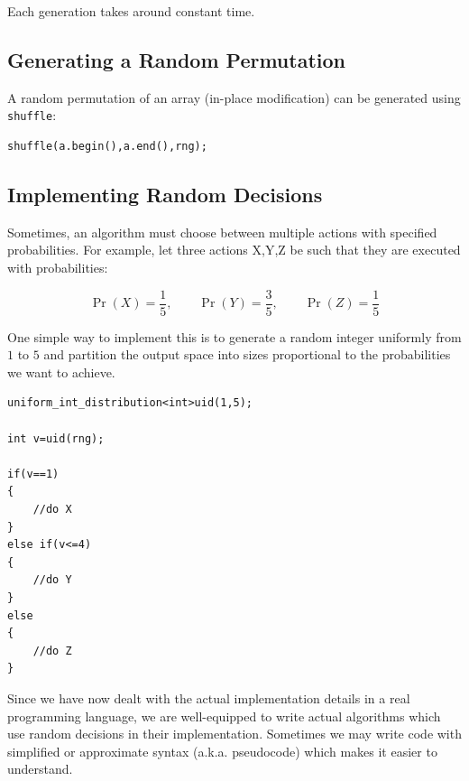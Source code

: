 \noindent Each generation takes around constant time.

\subsection*{Generating a Random Permutation}

A random permutation of an array (in-place modification) can be generated using \texttt{shuffle}:

\begin{verbatim}
shuffle(a.begin(),a.end(),rng);
\end{verbatim}

\subsection*{Implementing Random Decisions}

Sometimes, an algorithm must choose between multiple actions with specified probabilities. For example, let three actions X,Y,Z be such that they are executed with probabilities:

\[
\Pr(X)=\frac{1}{5},
\qquad
\Pr(Y)=\frac{3}{5},
\qquad
\Pr(Z)=\frac{1}{5}
\]

\noindent One simple way to implement this is to generate a random integer uniformly from \(1\) to \(5\) and 
partition the output space into sizes proportional to the probabilities we want to achieve.

\begin{center}
\begin{minipage}{0.9\linewidth}
\begin{framed}
\begin{Verbatim}
uniform_int_distribution<int>uid(1,5);

int v=uid(rng);

if(v==1)
{
    //do X
}
else if(v<=4)
{
    //do Y
}
else
{
    //do Z
}
\end{Verbatim}
\vspace{-4mm}
\end{framed}
\end{minipage}
\end{center}

Since we have now dealt with the actual implementation details in a real programming language, we are 
well-equipped to write actual algorithms which use random decisions in their implementation. Sometimes we may 
write code with simplified or approximate syntax (a.k.a. pseudocode) which makes it easier to understand.

